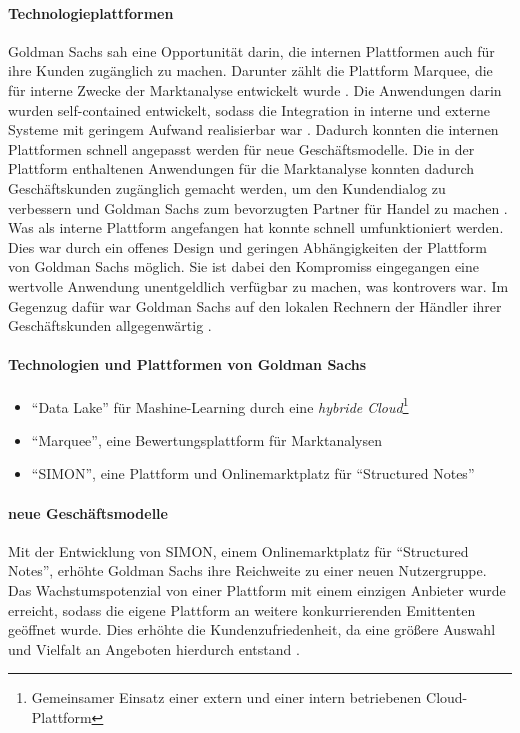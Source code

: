 \paragraph{Technologieplattformen}
Goldman Sachs sah eine Opportunität darin, die internen Plattformen auch für ihre Kunden zugänglich zu machen. Darunter zählt die Plattform Marquee, die für interne Zwecke der Marktanalyse entwickelt wurde \cite{Gupta:2017}.
Die Anwendungen darin wurden self-contained entwickelt, sodass die Integration in interne und externe Systeme mit geringem Aufwand realisierbar war \cite{Gupta:2017}. Dadurch konnten die internen Plattformen schnell angepasst werden für neue Geschäftsmodelle. Die in der Plattform enthaltenen Anwendungen für die Marktanalyse konnten dadurch Geschäftskunden zugänglich gemacht werden, um den Kundendialog zu verbessern und Goldman Sachs zum bevorzugten Partner für Handel zu machen \cite{Gupta:2017}.
\medskip
\\
Was als interne Plattform angefangen hat konnte schnell umfunktioniert werden. Dies war durch ein offenes Design und geringen Abhängigkeiten der Plattform von Goldman Sachs möglich. Sie ist dabei den Kompromiss eingegangen eine wertvolle Anwendung unentgeldlich verfügbar zu machen, was kontrovers war. Im Gegenzug dafür war Goldman Sachs auf den lokalen Rechnern der Händler ihrer Geschäftskunden allgegenwärtig \cite{Gupta:2017}.
%
\paragraph{Technologien und Plattformen von Goldman Sachs}
\label{goldman:plattform}
\begin{itemize}
    \item \enquote{Data Lake} für Mashine-Learning durch eine \emph{hybride Cloud}\footnote{Gemeinsamer Einsatz einer extern und einer intern betriebenen Cloud-Plattform}
    \item \enquote{Marquee}, eine Bewertungsplattform für Marktanalysen
    \item \enquote{SIMON}, eine Plattform und Onlinemarktplatz für \enquote{Structured Notes}
\end{itemize}

\paragraph{neue Geschäftsmodelle}
Mit der Entwicklung von SIMON, einem Onlinemarktplatz für \enquote{Structured Notes}, erhöhte Goldman Sachs ihre Reichweite zu einer neuen Nutzergruppe. Das Wachstumspotenzial von einer Plattform mit einem einzigen Anbieter wurde erreicht, sodass die eigene Plattform an weitere konkurrierenden Emittenten geöffnet wurde. Dies erhöhte die Kundenzufriedenheit, da eine größere Auswahl und Vielfalt an Angeboten hierdurch entstand \cite{Gupta:2017}.



